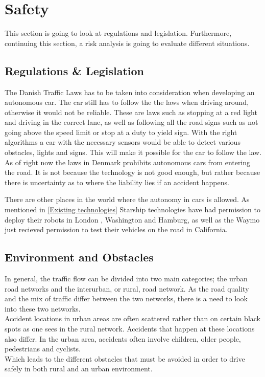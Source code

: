 
\section{Safety} \label{Safety}

This section is going to look at regulations and legislation. Furthermore, continuing this section, a risk analysis is going to evaluate different situations.

\subsection{Regulations \& Legislation} \label{Regulationslegislations}
The Danish Traffic Laws has to be taken into consideration when developing an autonomous car.\cite{TrafficLaws} The car still has to follow the the laws when driving around, otherwise it would not be reliable. These are laws such as stopping at a red light and driving in the correct lane, as well as following all the road signs such as not going above the speed limit or stop at a duty to yield sign. With the right algorithms a car with the necessary sensors would be able to detect various obstacles, lights and signs. This will make it possible for the car to follow the law. As of right now the laws in Denmark prohibits autonomous cars from entering the road. It is not because the technology is not good enough, but rather because there is uncertainty as to where the liability lies if an accident happens.\cite{Illigle}

\noindent There are other places in the world where the autonomy in cars is allowed. As mentioned in \ref{Existing technologies} Starship technologies have had permission to deploy their robots in London , Washington and Hamburg, as well as the Waymo just recieved permission to test their vehicles on the road in California.\cite{DeliverySystem}

\subsection{ Environment and Obstacles } \label{Environmentobstacles}
In general, the traffic flow can be divided into two main categories; the urban road networks and the interurban, or rural, road network. As the road quality and the mix of traffic differ between the two networks, there is a need to look into these two networks.\cite{EUen}\\

\noindent Accident locations in urban areas are often scattered rather than on certain black spots as one sees in the rural network. 
Accidents that happen at these locations also differ. In the urban area, accidents often involve children, older people, pedestrians and cyclists.\cite{UCE}\\Which leads to the different obstacles that must be avoided in order to drive safely in both rural and an urban environment. 


